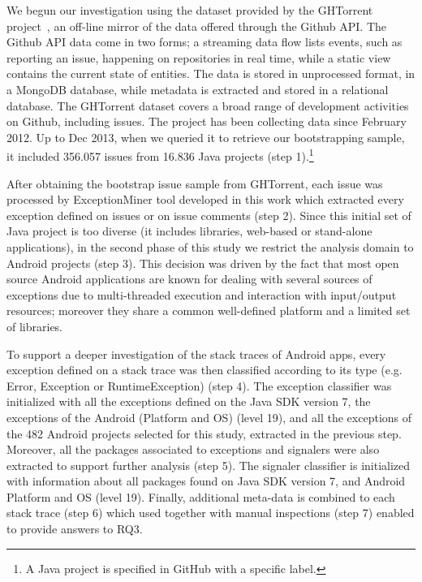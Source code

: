 \documentclass[conference]{IEEEtran}
\begin{document}
We begun our investigation using the dataset provided by the GHTorrent
project~\cite{Gousi13}, an off-line mirror of the data offered through the
Github API. The Github API data come in two forms; a streaming data flow lists
events, such as reporting an issue, happening on repositories in real time,
while a static view contains the current state of entities. The data is stored
in unprocessed format, in a MongoDB database, while metadata is extracted and
stored in a relational database. The GHTorrent dataset covers a broad range of
development activities on Github, including issues. The project has been
collecting data since February 2012. Up to Dec 2013, when we queried it to
retrieve our bootstrapping sample, it included 356.057 issues from 16.836
Java projects (step 1).\footnote{A Java project is specified in GitHub with a
specific label.}

After obtaining the bootstrap issue sample from GHTorrent, each issue was
processed by ExceptionMiner tool developed in this work which extracted every
exception defined on issues or on issue comments (step 2). Since this initial
set of Java project is too diverse (it includes libraries, web-based or
stand-alone applications), in the second phase of this study we restrict the
analysis domain to Android projects (step 3). This decision was driven by the
fact that most open source Android applications are known for dealing
with several sources of exceptions due to multi-threaded execution and
interaction with input/output resources; moreover they share a common
well-defined platform and a limited set of libraries.

To support a deeper investigation of the stack traces of Android apps, every
exception defined on a stack trace was then classified according to its type
(e.g. Error, Exception or RuntimeException) (step 4). The exception classifier
was initialized with all the exceptions defined on the Java SDK version 7, the
exceptions of the Android (Platform and OS) (level 19), and all the exceptions
of the 482 Android projects selected for this study, extracted in the previous
step. Moreover, all the packages associated to exceptions and signalers were
also extracted to support further analysis (step 5). The signaler classifier is
initialized with information about all packages found on Java SDK version 7, and
Android Platform and OS (level 19). Finally, additional meta-data is combined to
each stack trace (step 6) which used together with manual inspections (step 7)
enabled to provide answers to RQ3.
\end{document}
